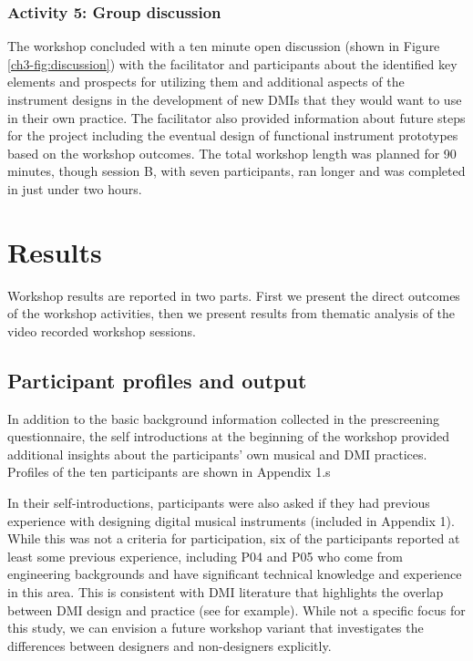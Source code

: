 \documentclass[letterpaper, 12pt]{article}
\begin{document}
\subsubsection{Activity 5: Group discussion}
\label{ch3-sec:activity-5-group-discussion}

The workshop concluded with a ten minute open discussion (shown in Figure \ref{ch3-fig:discussion}) with the facilitator and participants about the identified key elements and prospects for utilizing them and additional aspects of the instrument designs in the development of new DMIs that they would want to use in their own practice. The facilitator also provided information about future steps for the project including the eventual design of functional instrument prototypes based on the workshop outcomes. The total workshop length was planned for 90 minutes, though session B, with seven participants, ran longer and was completed in just under two hours. 

\section{Results}
\label{ch3-sec:results}

Workshop results are reported in two parts. First we present the direct outcomes of the workshop activities, then we present results from thematic analysis of the video recorded workshop sessions. 

\subsection{Participant profiles and output}
\label{ch3-sec:participant-profiles-and-output}

In addition to the basic background information collected in the prescreening questionnaire, the self introductions at the beginning of the workshop provided additional insights about the participants' own musical and DMI practices. Profiles of the ten participants are shown in Appendix 1.s

In their self-introductions, participants were also asked if they had previous experience with designing digital musical instruments (included in Appendix 1). While this was not a criteria for participation, six of the participants reported at least some previous experience, including P04 and P05 who come from engineering backgrounds and have significant technical knowledge and experience in this area. This is consistent with DMI literature that highlights the overlap between DMI design and practice (see \citet{Magnusson2008, Morreale2017, Morreale2018} for example). While not a specific focus for this study, we can envision a future workshop variant that investigates the differences between designers and non-designers explicitly.
\end{document}
